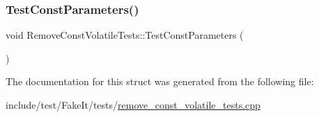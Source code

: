 \subsubsection{\texorpdfstring{TestConstParameters()}{TestConstParameters()}}
{\footnotesize\ttfamily void Remove\+Const\+Volatile\+Tests\+::\+Test\+Const\+Parameters (\begin{DoxyParamCaption}{ }\end{DoxyParamCaption})\hspace{0.3cm}{\ttfamily [inline]}}



The documentation for this struct was generated from the following file\+:\begin{DoxyCompactItemize}
\item 
include/test/\+Fake\+It/tests/\mbox{\hyperlink{remove__const__volatile__tests_8cpp}{remove\+\_\+const\+\_\+volatile\+\_\+tests.\+cpp}}\end{DoxyCompactItemize}
